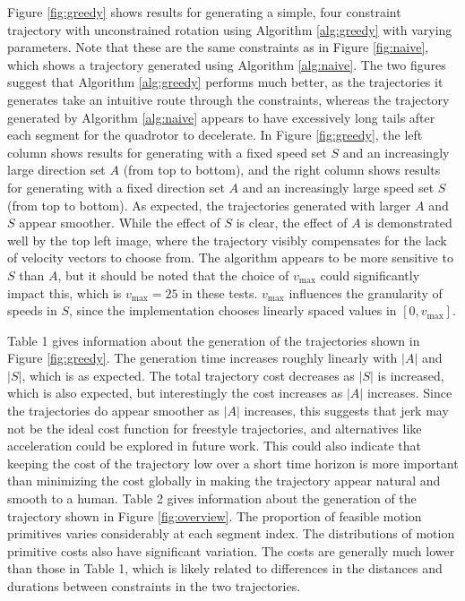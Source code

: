 \documentclass[pageno]{jpaper}
\begin{document}
Figure \ref{fig:greedy} shows results for generating a simple, four constraint trajectory with unconstrained rotation using Algorithm \ref{alg:greedy} with varying parameters. Note that these are the same constraints as in Figure \ref{fig:naive}, which shows a trajectory generated using Algorithm \ref{alg:naive}. The two figures suggest that Algorithm \ref{alg:greedy} performs much better, as the trajectories it generates take an intuitive route through the constraints, whereas the trajectory generated by Algorithm \ref{alg:naive} appears to have excessively long tails after each segment for the quadrotor to decelerate. In Figure \ref{fig:greedy}, the left column shows results for generating with a fixed speed set $S$ and an increasingly large direction set $A$ (from top to bottom), and the right column shows results for generating with a fixed direction set $A$ and an increasingly large speed set $S$ (from top to bottom). As expected, the trajectories generated with larger $A$ and $S$ appear smoother. While the effect of $S$ is clear, the effect of $A$ is demonstrated well by the top left image, where the trajectory visibly compensates for the lack of velocity vectors to choose from. The algorithm appears to be more sensitive to $S$ than $A$, but it should be noted that the choice of $v_{\max}$ could significantly impact this, which is $v_{\max} = 25$ in these tests. $v_{\max}$ influences the granularity of speeds in $S$, since the implementation chooses linearly spaced values in $[0, v_{\max}]$.

Table 1 gives information about the generation of the trajectories shown in Figure \ref{fig:greedy}. The generation time increases roughly linearly with $|A|$ and $|S|$, which is as expected. The total trajectory cost decreases as $|S|$ is increased, which is also expected, but interestingly the cost increases as $|A|$ increases. Since the trajectories do appear smoother as $|A|$ increases, this suggests that jerk may not be the ideal cost function for freestyle trajectories, and alternatives like acceleration could be explored in future work. This could also indicate that keeping the cost of the trajectory low over a short time horizon is more important than minimizing the cost globally in making the trajectory appear natural and smooth to a human. Table 2 gives information about the generation of the trajectory shown in Figure \ref{fig:overview}. The proportion of feasible motion primitives varies considerably at each segment index. The distributions of motion primitive costs also have significant variation. The costs are generally much lower than those in Table 1, which is likely related to differences in the distances and durations between constraints in the two trajectories.
\end{document}

